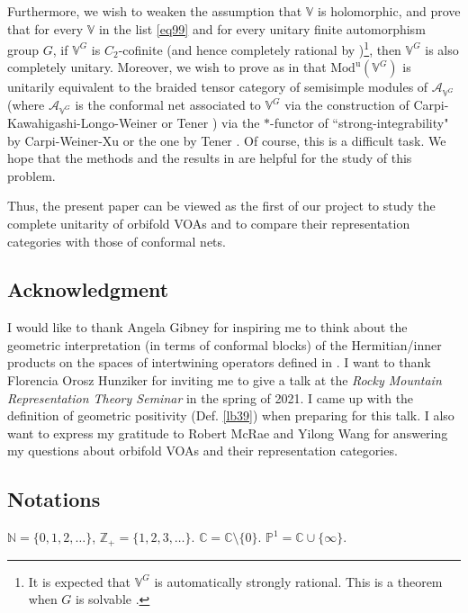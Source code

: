 \documentclass[11pt,b5paper,notitlepage]{article}
\theoremstyle{definition}
\theoremstyle{plain}
\newcommand{\mc}{\mathcal}
\newcommand{\uni}{\mathrm{u}}
\newcommand{\Vbb}{\mathbb V}
\newcommand{\Cbb}{\mathbb C}
\newcommand{\Nbb}{\mathbb N}
\newcommand{\Zbb}{\mathbb Z}
\newcommand{\Pbb}{\mathbb P}
\newcommand{\Mod}{\mathrm{Mod}}
\numberwithin{equation}{section}
\begin{document}
Furthermore, we wish to weaken the assumption that $\Vbb$ is holomorphic, and prove that for every $\Vbb$ in the list \eqref{eq99} and for every unitary finite automorphism group $G$, if $\Vbb^G$ is $C_2$-cofinite (and hence completely rational by \cite{McR21})\footnote{It is expected that $\Vbb^G$ is automatically strongly rational. This is a theorem when $G$ is solvable \cite{Miy15,CM16}.}, then $\Vbb^G$ is also completely unitary. Moreover, we wish to prove as in \cite{Gui20} that $\Mod^\uni(\Vbb^G)$ is unitarily equivalent to the braided tensor category of semisimple modules of $\mc A_{\Vbb^G}$ (where $\mc A_{\Vbb^G}$ is the conformal net associated to $\Vbb^G$ via the construction of Carpi-Kawahigashi-Longo-Weiner \cite{CKLW18} or Tener \cite{Ten19a}) via the $*$-functor of ``strong-integrability" by Carpi-Weiner-Xu \cite{CWX} or the one by Tener \cite{Ten19b}. Of course, this is a difficult task. We hope that the methods and the results in \cite{Gui19c,Ten19c,Gui20,CGGH23,CT23} are helpful for the study of this problem.

Thus, the present paper can be viewed as the first of our project to study the complete unitarity of orbifold VOAs and to compare their representation categories with those of conformal nets.





\subsection*{Acknowledgment}

I would like to thank Angela Gibney for inspiring me to think about the geometric interpretation (in terms of conformal blocks) of the Hermitian/inner products on the spaces of intertwining operators defined in \cite{Gui19b}. I want to thank Florencia Orosz Hunziker for inviting me to give a talk at the \textit{Rocky Mountain Representation Theory Seminar} in the spring of 2021. I came up with the definition of geometric positivity (Def. \ref{lb39}) when preparing for this talk.  I also want to express my gratitude to Robert McRae and Yilong Wang for answering my questions about orbifold VOAs and their representation categories. 







\subsection*{Notations}
$\Nbb=\{0,1,2,\dots\}$, $\Zbb_+=\{1,2,3,\dots\}$. $\Cbb=\Cbb\setminus\{0\}$. $\Pbb^1=\Cbb\cup\{\infty\}$.
\end{document}
